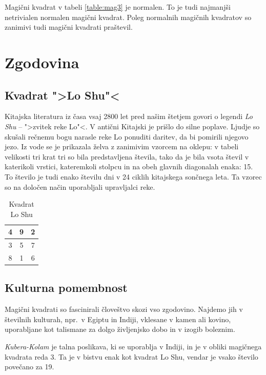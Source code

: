\documentclass[a4paper,12pt]{article}
\newenvironment{magic}[3]
{\begin{table}[!ht]
   \centering
   \caption{#2}
   \label{#3}
   \large
   \begin{tabular}{|*{#1}{c|}}
   \hline}
{\end{tabular}
   \normalsize
\end{table}}
\theoremstyle{definition}
\theoremstyle{plain}
\begin{document}
Magični kvadrat v tabeli \ref{table:mag3} je normalen.
To je tudi najmanjši netrivialen normalen magični kvadrat.
Poleg normalnih magičnih kvadratov so zanimivi tudi magični kvadrati praštevil.


\section{Zgodovina}

\subsection{Kvadrat ">Lo Shu"<}

Kitajska literatura iz časa vsaj 2800 let pred našim štetjem govori o legendi
\emph{Lo Shu} -- ">zvitek reke Lo"<. V antični Kitajski je prišlo do
silne poplave. Ljudje so skušali rečnemu bogu narasle reke Lo ponuditi daritev,
da bi pomirili njegovo jezo. Iz vode se je prikazala želva z zanimivim vzorcem
na oklepu: v tabeli velikosti tri krat tri so bila predstavljena števila, tako
da je bila vsota števil v katerikoli vrstici, kateremkoli stolpcu in na obeh
glavnih diagonalah enaka: 15. To število je tudi enako številu dni v 24 ciklih
kitajskega sončnega leta. Ta vzorec so na določen način uporabljali upravljalci
reke.

\begin{magic}{3}{Kvadrat Lo Shu}{table:loshu}
 4 & 9 & 2 \\\hline
 3 & 5 & 7 \\\hline
 8 & 1 & 6 \\\hline  
\end{magic}
%   


\subsection{Kulturna pomembnost}

Magični kvadrati so fascinirali človeštvo skozi vso zgodovino. Najdemo jih
v številnih kulturah, npr.\ v Egiptu in Indiji, vklesane v kamen ali
kovino, uporabljane kot talismane za dolgo življenjsko dobo in v
izogib boleznim.

\emph{Kubera-Kolam} je talna poslikava, ki se uporablja v Indiji, in je v
obliki magičnega kvadrata reda 3. Ta je v bistvu enak kot kvadrat
Lo Shu, vendar je vsako število povečano za 19.
\end{document}
